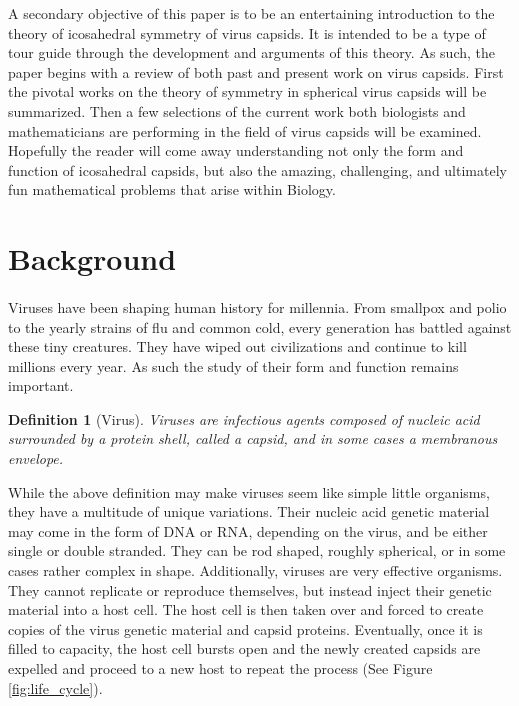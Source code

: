 \documentclass[12pt,letter]{article}
\newtheorem*{definition*}{Definition}
\begin{document}
A secondary objective of this paper is to be an entertaining introduction to the theory of icosahedral symmetry of virus capsids. It is intended to be a type of tour guide through the development and arguments of this theory. As such, the paper begins with a review of both past and present work on virus capsids. First the pivotal works on the theory of symmetry in spherical virus capsids will be summarized. Then a few selections of the current work both biologists and mathematicians are performing in the field of virus capsids will be examined. Hopefully the reader will come away understanding not only the form and function of icosahedral capsids, but also the amazing, challenging, and ultimately fun mathematical problems that arise within Biology. \\

\section{Background} %

\paragraph{}
Viruses have been shaping human history for millennia. From smallpox and polio to the yearly strains of flu and common cold, every generation has battled against these tiny creatures. They have wiped out civilizations and continue to kill millions every year. As such the study of their form and function remains important.

\begin{definition*}[Virus]
Viruses are infectious agents composed of nucleic acid surrounded by a protein shell, called a capsid, and in some cases a membranous envelope. 
\end{definition*}
While the above definition may make viruses seem like simple little organisms, they have a multitude of unique variations. Their nucleic acid genetic material may come in the form of DNA or RNA, depending on the virus, and be either single or double stranded. They can be rod shaped, roughly spherical, or in some cases rather complex in shape. Additionally, viruses are very effective organisms. They cannot replicate or reproduce themselves, but instead inject their genetic material into a host cell. The host cell is then taken over and forced to create copies of the virus genetic material and capsid proteins. Eventually, once it is filled to capacity, the host cell bursts open and the newly created capsids are expelled and proceed to a new host to repeat the process (See Figure \ref{fig:life_cycle}). \cite{Campbell:2002}\\
\end{document}
